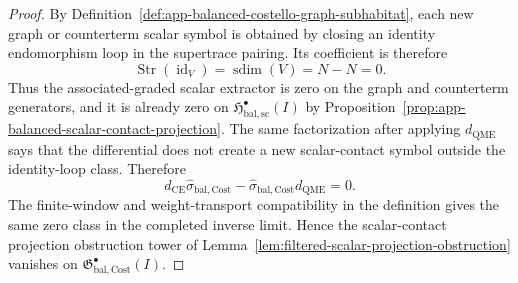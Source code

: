\begin{proof}
  By Definition~\ref{def:app-balanced-costello-graph-subhabitat}, each
  new graph or counterterm scalar symbol is obtained by closing an
  identity endomorphism loop in the supertrace pairing.  Its coefficient
  is therefore
  \[
    \operatorname{Str}(\operatorname{id}_V)
      =
    \operatorname{sdim}(V)=N-N=0.
  \]
  Thus the associated-graded scalar extractor is zero on the graph and
  counterterm generators, and it is already zero on
  \(\mathfrak H^\bullet_{\mathrm{bal,sc}}(I)\) by
  Proposition~\ref{prop:app-balanced-scalar-contact-projection}.  The
  same factorization after applying \(d_{\mathrm{QME}}\) says that the
  differential does not create a new scalar-contact symbol outside the
  identity-loop class.  Therefore
  \[
    d_{\mathrm{CE}}\widehat\sigma_{\mathrm{bal,Cost}}
      -
    \widehat\sigma_{\mathrm{bal,Cost}}d_{\mathrm{QME}}=0.
  \]
  The finite-window and weight-transport compatibility in the definition
  gives the same zero class in the completed inverse limit.  Hence the
  scalar-contact projection obstruction tower of
  Lemma~\ref{lem:filtered-scalar-projection-obstruction} vanishes on
  \(\mathfrak G^\bullet_{\mathrm{bal,Cost}}(I)\).
\end{proof}

